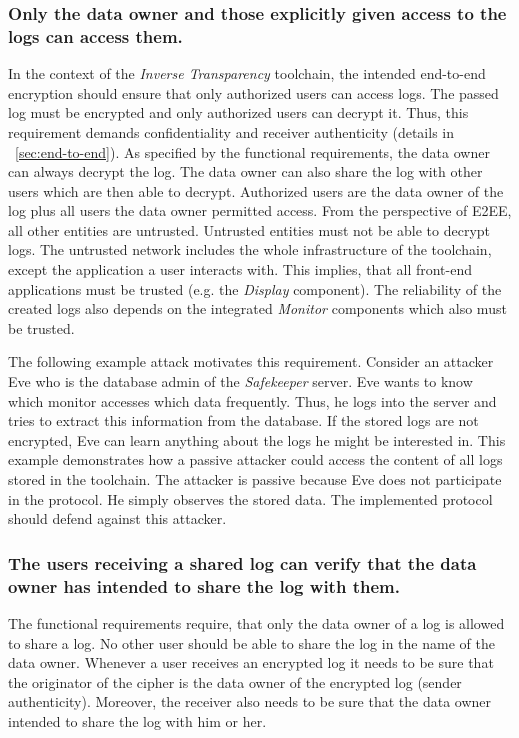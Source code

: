 \documentclass[../main.tex]{subfiles}
\begin{document}
\subsubsection{Only the data owner and those explicitly given access to the logs can access them.}
In the context of the \emph{Inverse Transparency} toolchain, the intended end-to-end encryption should ensure that only authorized users can access logs.
The passed log must be encrypted and only authorized users can decrypt it.
Thus, this requirement demands confidentiality and receiver authenticity (details in ~\cref{sec:end-to-end}).
As specified by the functional requirements, the data owner can always decrypt the log.
The data owner can also share the log with other users which are then able to decrypt.
Authorized users are the data owner of the log plus all users the data owner permitted access.
From the perspective of E2EE, all other entities are untrusted.
Untrusted entities must not be able to decrypt logs.
The untrusted network includes the whole infrastructure of the toolchain, except the application a user interacts with.
This implies, that all front-end applications must be trusted (e.g. the \emph{Display} component).
The reliability of the created logs also depends on the integrated \emph{Monitor} components which also must be trusted.

The following example attack motivates this requirement.
Consider an attacker Eve who is the database admin of the \emph{Safekeeper} server.
Eve wants to know which monitor accesses which data frequently.
Thus, he logs into the server and tries to extract this information from the database.
If the stored logs are not encrypted, Eve can learn anything about the logs he might be interested in.
This example demonstrates how a passive attacker could access the content of all logs stored in the toolchain.
The attacker is passive because Eve does not participate in the protocol.
He simply observes the stored data.
The implemented protocol should defend against this attacker.


\subsubsection{The users receiving a shared log can verify that the data owner has intended to share the log with them.}

The functional requirements require, that only the data owner of a log is allowed to share a log.
No other user should be able to share the log in the name of the data owner.
Whenever a user receives an encrypted log it needs to be sure that the originator of the cipher is the data owner of the encrypted log (sender authenticity).
Moreover, the receiver also needs to be sure that the data owner intended to share the log with him or her.
\end{document}
